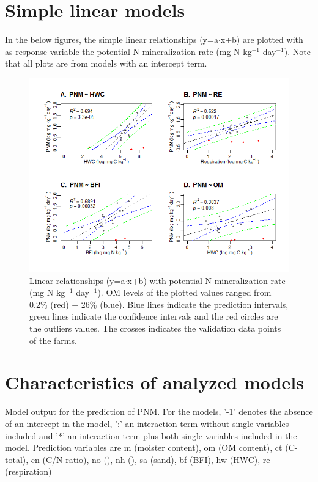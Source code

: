 \documentclass[10pt,twoside,dutch,english]{report}
\begin{document}
\begin{appendices}
\section{Simple linear models}
\label{chap: Simple linear models}
In the below figures, the simple linear relationships (y=a$\cdot$x+b) are plotted with as response variable the potential N mineralization rate (mg N kg$^{-1}$ day$^{-1}$). Note that all plots are from models with an intercept term.
\begin{figure}[H] %
	\includegraphics[width=1\linewidth]{results_models}
	\caption{Linear relationships (y=a$\cdot$x+b) with potential N mineralization rate (mg N kg$^{-1}$ day$^{-1}$). OM levels of the plotted values ranged from 0.2\% (red) $-$ 26\% (blue).  Blue lines indicate the prediction intervals, green lines indicate the confidence intervals and the red circles are the outliers values. The crosses indicates the validation data points of the farms. }
	\label{fig:results_models}
\end{figure}


\section{Characteristics of analyzed models }

\begin{table}[H] %
		\caption{Model output for the prediction of PNM. For the models,  '-1' denotes the absence of an intercept in the model,  ':' an interaction term without single variables included and '*' an interaction term plus both single variables included in the model. Prediction variables are m (moister content), om (OM content), ct (C-total), cn (C/N ratio), no (), nh (), sa (sand), bf (BFI), hw (HWC), re (respiration)}
		\footnotesize 
		\renewcommand{\arraystretch}{1.2}
		

\end{table}
\end{appendices}
\end{document}
